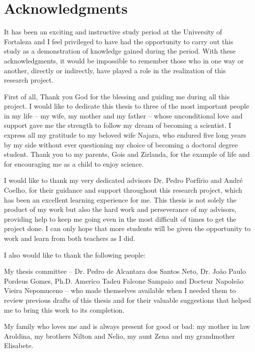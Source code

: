 \chapter*{Acknowledgments} 



It has been an exciting and instructive study period at the University of Fortaleza and I feel privileged to have had the opportunity to carry out this study as a demonstration of
knowledge gained during the period. With these acknowledgments, it would be impossible to remember those who in one way or another, directly or indirectly, have played a role in the realization of this research project. 

First of all, Thank you God for the blessing and guiding me during all this project. I would like to dedicate this thesis to three of the most important people in my life
– my wife, my mother and my father – whose unconditional love and support gave me the
strength to follow my dream of becoming a scientist. I express all my gratitude to my beloved wife Najara, who endured five long years by my side without ever questioning my choice of becoming a doctoral degree student. Thank you to my parents, Gois and Zirlanda,  for the example of life and for encouraging me as a child to enjoy science.

I would like to thank my very dedicated advisors Dr. Pedro Porfírio and André Coelho, for their guidance and support throughout this research project, which has been an excellent
learning experience for me. This thesis is not solely the product of my work but also the hard work and perseverance of my advisors, providing help to keep me going even in the most difficult of times to get the project done. I can only hope that more students will be given the opportunity to work and learn from both teachers as I did.

I also would like to thank the following people:

My thesis committee – Dr. Pedro de Alcantara dos Santos Neto, Dr. João Paulo Pordeus Gomes, Ph.D. Americo Tadeu Falcone Sampaio and Docteur Napoleão Vieira Nepomuceno – who made themselves available when I needed them to review previous drafts of this thesis and for their valuable suggestions that helped me to bring this work to its completion.

My family who loves me and is always present for good or bad: my mother in law Aroldina, my brothers Nilton and Nelio, my aunt Zena and my grandmother Elisabete.

